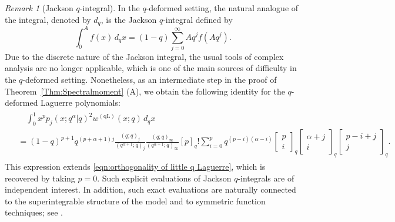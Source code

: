 \documentclass{amsart}
\newcommand{\qbinom}[2]{{\begin{bmatrix}#1\\#2\end{bmatrix}}_q}
\theoremstyle{plain}
\theoremstyle{remark}
\newtheorem{rem}{Remark}
\numberwithin{equation}{section}
\begin{document}
\begin{rem}[Jackson $q$-integral]
In the $q$-deformed setting, the natural analogue of the integral, denoted by $d_q$, is the Jackson $q$-integral defined by
\begin{equation} \label{def of Jackson integral} 
    \int_{0}^{A}f(x)\,d_{q}x=(1-q)\sum_{j=0}^{\infty}Aq^{j}f(Aq^{j}). 
\end{equation} 
Due to the discrete nature of the Jackson integral, the usual tools of complex analysis are no longer applicable, which is one of the main sources of difficulty in the $q$-deformed setting. Nonetheless, as an intermediate step in the proof of Theorem~\ref{Thm:Spectralmoment} (A), we obtain the following identity for the $q$-deformed Laguerre polynomials:
\begin{align}
\begin{split}
&\quad \int_{0}^{1}x^{p}p_{j}(x;q^{\alpha}|q)^{2}w^{(\mathrm{qL})}(x;q)\,d_{q}x 
\\
&= (1-q)^{p+1}q^{(p+\alpha+1)j}\frac{(q;q)_{j}}{(q^{\alpha+1};q)_{j}}\frac{(q;q)_{\infty}}{(q^{\alpha+1};q)_{\infty}}  [p]_q!  \sum_{i=0}^{p} q^{ (p-i)(\alpha-i) }  \qbinom{p}{i} \qbinom{\alpha+j}{i} \qbinom{p-i+j}{j}.
\end{split}
\end{align}
This expression extends \eqref{eqn:orthogonality of little q Laguerre}, which is recovered by taking $p=0$. Such explicit evaluations of Jackson $q$-integrals are of independent interest. In addition, such exact evaluations are naturally connected to the superintegrable structure of the model and to symmetric function techniques; see \cite[Section~3.3]{LWYZ25}. 
\end{rem}
\end{document}
